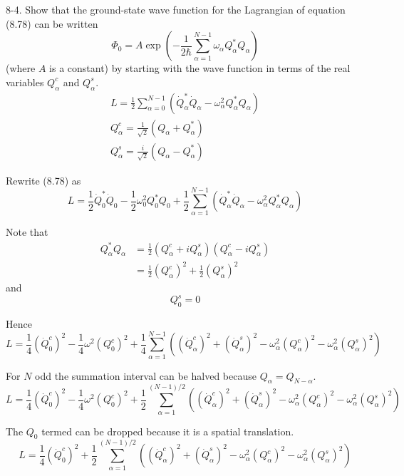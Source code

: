 \documentclass[12pt]{article}
\begin{document}
8-4.
Show that the ground-state wave function for the Lagrangian of
equation (8.78) can be written
\begin{equation*}
\Phi_0=A\exp\left(
-\frac{1}{2\hbar}
\sum_{\alpha=1}^{N-1}
\omega_\alpha Q_\alpha^*Q_\alpha
\right)
\tag{8.83}
\end{equation*}
(where $A$ is a constant) by starting with the wave function in terms of
the real variables $Q_\alpha^c$ and $Q_\alpha^s$.
\begin{gather*}
L=\frac{1}{2}\sum_{\alpha=0}^{N-1}
\left(\dot Q_\alpha^*\dot Q_\alpha-\omega_\alpha^2Q_\alpha^*Q_\alpha\right)
\tag{8.78}
\\
Q_\alpha^c=\frac{1}{\sqrt2}(Q_\alpha+Q_\alpha^*)
\tag{8.79}
\\
Q_\alpha^s=\frac{i}{\sqrt2}(Q_\alpha-Q_\alpha^*)
\tag{8.80}
\end{gather*}

Rewrite (8.78) as
\begin{equation*}
L=\frac{1}{2}\dot Q_0^*\dot Q_0
-\frac{1}{2}\omega_0^2Q_0^*Q_0
+\frac{1}{2}\sum_{\alpha=1}^{N-1}
\left(\dot Q_\alpha^*\dot Q_\alpha-\omega_\alpha^2Q_\alpha^*Q_\alpha\right)
\end{equation*}

Note that
\begin{align*}
Q_\alpha^*Q_\alpha
&=\frac{1}{2}(Q_\alpha^c+iQ_\alpha^s)(Q_\alpha^c-iQ_\alpha^s)
\\
&=\frac{1}{2}(Q_\alpha^c)^2+\frac{1}{2}(Q_\alpha^s)^2
\end{align*}
and
\begin{equation*}
Q_0^s=0
\end{equation*}

Hence
\begin{equation*}
L=\frac{1}{4}(\dot Q_0^c)^2-\frac{1}{4}\omega^2(Q_0^c)^2
+\frac{1}{4}\sum_{\alpha=1}^{N-1}
\left(
(\dot Q_\alpha^c)^2
+(\dot Q_\alpha^s)^2
-\omega_\alpha^2(Q_\alpha^c)^2
-\omega_\alpha^2(Q_\alpha^s)^2
\right)
\end{equation*}

For $N$ odd the summation interval can be halved because $Q_\alpha=Q_{N-\alpha}$.
\begin{equation*}
L=\frac{1}{4}(\dot Q_0^c)^2
-\frac{1}{4}\omega^2(Q_0^c)^2
+\frac{1}{2}\sum_{\alpha=1}^{(N-1)/2}
\left(
(\dot Q_\alpha^c)^2
+(\dot Q_\alpha^s)^2
-\omega_\alpha^2(Q_\alpha^c)^2
-\omega_\alpha^2(Q_\alpha^s)^2
\right)
\end{equation*}

The $Q_0$ termed can be dropped because it is a spatial translation.
\begin{equation*}
L=\frac{1}{4}(\dot Q_0^c)^2
+\frac{1}{2}\sum_{\alpha=1}^{(N-1)/2}
\left(
(\dot Q_\alpha^c)^2
+(\dot Q_\alpha^s)^2
-\omega_\alpha^2(Q_\alpha^c)^2
-\omega_\alpha^2(Q_\alpha^s)^2
\right)
\end{equation*}

\end{document}
